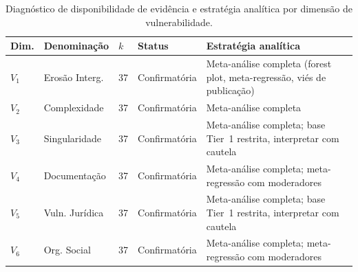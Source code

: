 \documentclass[12pt,a4paper]{article}
\begin{document}
\begin{table}[H]
\caption{Diagnóstico de disponibilidade de evidência e estratégia analítica por dimensão de vulnerabilidade.}
\label{tab:viability}
\centering
\small
\begin{tabular}{p{0.8cm}p{2.2cm}p{1.2cm}p{2.0cm}p{5.5cm}}
\toprule
\textbf{Dim.} & \textbf{Denominação} & \textbf{$k$} & \textbf{Status} & \textbf{Estratégia analítica} \\
\midrule
$V_1$ & Erosão Interg. & 37 & Confirmatória & Meta-análise completa (forest plot, meta-regressão, viés de publicação) \\
$V_2$ & Complexidade & 37 & Confirmatória & Meta-análise completa \\
$V_3$ & Singularidade & 37 & Confirmatória & Meta-análise completa; base Tier~1 restrita, interpretar com cautela \\
$V_4$ & Documentação & 37 & Confirmatória & Meta-análise completa; meta-regressão com moderadores \\
$V_5$ & Vuln. Jurídica & 37 & Confirmatória & Meta-análise completa; base Tier~1 restrita, interpretar com cautela \\
$V_6$ & Org. Social & 37 & Confirmatória & Meta-análise completa; meta-regressão com moderadores \\
\bottomrule
\end{tabular}
\end{table}
\end{document}
